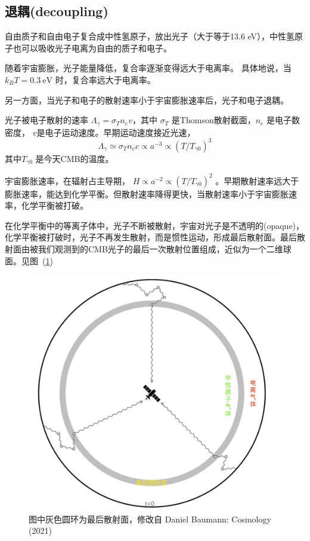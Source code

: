 \documentclass[12pt]{ctexart}
\newcommand{\reffig}[1]{图~(\ref{#1})}
\begin{document}
\subsection{退耦(decoupling)}

自由质子和自由电子复合成中性氢原子，放出光子（大于等于13.6 eV），中性氢原子也可以吸收光子电离为自由的质子和电子。

随着宇宙膨胀，光子能量降低，复合率逐渐变得远大于电离率。
具体地说，当 $k_B T =0.3 \mathrm{~eV}$ 时，复合率远大于电离率。

另一方面，当光子和电子的散射速率小于宇宙膨胀速率后，光子和电子退耦。

光子被电子散射的速率 $\Lambda_\gamma = \sigma_T n_e v$，其中 $\sigma_T$ 是Thomson散射截面，$n_e$ 是电子数密度， $v$是电子运动速度。早期运动速度接近光速，$$\Lambda_\gamma \simeq \sigma_T n_e c \propto a^{-3} \propto \left(T/T_{\gamma 0}\right)^3$$ 其中$T_{\gamma 0}$ 是今天CMB的温度。

宇宙膨胀速率，在辐射占主导期， $H\propto a^{-2} \propto \left(T/T_{\gamma 0}\right)^2$ 。早期散射速率远大于膨胀速率，能达到化学平衡。但散射速率降得更快，当散射速率小于宇宙膨胀速率，化学平衡被打破。

在化学平衡中的等离子体中，光子不断被散射，宇宙对光子是不透明的(opaque)，化学平衡被打破时，光子不再发生散射，而是惯性运动，形成最后散射面。最后散射面由被我们观测到的CMB光子的最后一次散射位置组成，近似为一个二维球面。见\reffig{fig.LastScat}

\begin{figure}[!hbtp]
	\centering
	\includegraphics[width=1.0\linewidth]{lastScatter2022.jpg}
	\caption{图中灰色圆环为最后散射面，修改自 Daniel Baumann: Cosmology (2021)} \label{fig.LastScat}
\end{figure}
\end{document}
